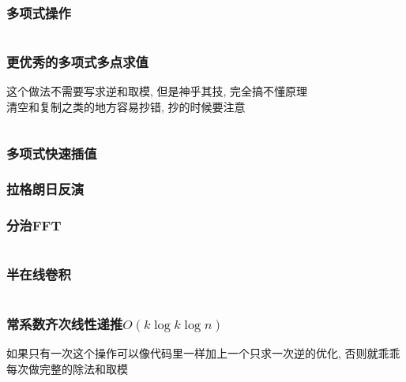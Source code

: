 \documentclass[a4paper]{article}
\begin{document}
\begin{multicols}{2}

			
				\subsubsection{多项式操作}
					\inputminted{cpp}{../src/math/多项式操作.cpp}

				\subsubsection{更优秀的多项式多点求值}
					这个做法不需要写求逆和取模, 但是神乎其技, 完全搞不懂原理 \\
					清空和复制之类的地方容易抄错, 抄的时候要注意
					\inputminted{cpp}{../src/math/更优秀的多项式多点求值.cpp}

				\subsubsection{多项式快速插值}
					



				\subsubsection{拉格朗日反演}
					

				\subsubsection{分治FFT}
					\inputminted{cpp}{../src/math/分治FFT.cpp}

				\subsubsection{半在线卷积}
					\inputminted{cpp}{../src/math/半在线卷积.cpp}
				
				\subsubsection{常系数齐次线性递推$O(k\log k\log n)$}
					如果只有一次这个操作可以像代码里一样加上一个只求一次逆的优化, 否则就乖乖每次做完整的除法和取模
					\inputminted{cpp}{../src/math/常系数齐次线性递推.cpp}


\end{multicols}
\end{document}
